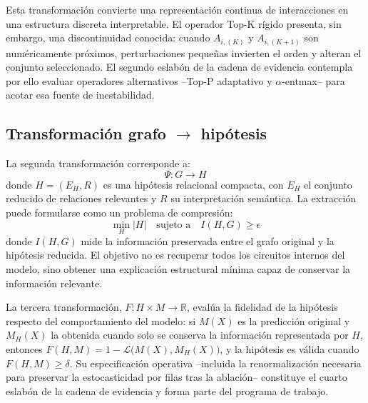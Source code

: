 Esta transformación convierte una representación continua de interacciones en una estructura discreta interpretable. El operador Top-K rígido presenta, sin embargo, una discontinuidad conocida: cuando $A_{i,(K)}$ y $A_{i,(K+1)}$ son numéricamente próximos, perturbaciones pequeñas invierten el orden y alteran el conjunto seleccionado. El segundo eslabón de la cadena de evidencia contempla por ello evaluar operadores alternativos --Top-P adaptativo y $\alpha$-entmax-- para acotar esa fuente de inestabilidad.

\subsection{Transformación grafo \texorpdfstring{$\to$}{->} hipótesis}

La segunda transformación corresponde a:
\begin{equation}
\Psi: G \to H
\end{equation}
donde $H = (E_H, R)$ es una hipótesis relacional compacta, con $E_H$ el conjunto reducido de relaciones relevantes y $R$ su interpretación semántica. La extracción puede formularse como un problema de compresión:
\begin{equation}
\min_{H} |H| \quad \text{sujeto a} \quad I(H, G) \geq \epsilon
\end{equation}
donde $I(H,G)$ mide la información preservada entre el grafo original y la hipótesis reducida. El objetivo no es recuperar todos los circuitos internos del modelo, sino obtener una explicación estructural mínima capaz de conservar la información relevante.

La tercera transformación, $F: H \times M \to \mathbb{R}$, evalúa la fidelidad de la hipótesis respecto del comportamiento del modelo: si $M(X)$ es la predicción original y $M_H(X)$ la obtenida cuando solo se conserva la información representada por $H$, entonces $F(H,M) = 1 - \mathcal{L}\big(M(X), M_H(X)\big)$, y la hipótesis es válida cuando $F(H,M) \geq \delta$. Su especificación operativa --incluida la renormalización necesaria para preservar la estocasticidad por filas tras la ablación-- constituye el cuarto eslabón de la cadena de evidencia y forma parte del programa de trabajo.
